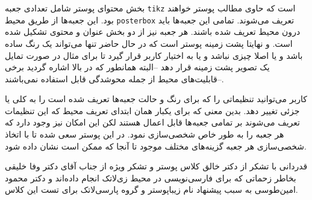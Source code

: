 \documentclass[debug,a0paper]{xebaposter}
\begin{document}
\begin{poster}
\begin{posterbox}[name=imagedataset,column=0,span=1,below=introduction,textborder=roundedleft]
بخش محتوای پوستر شامل تعدادی جعبه \texttt{tikz} است که حاوی مطالب پوستر خواهند بود. این جعبه‌ها از طریق 
محیط \texttt{posterbox} تعریف می‌شوند. تمامی این جعبه‌ها باید درون محیط  تعریف شده باشند. 
هر جعبه نیز از دو بخش عنوان و محتوی تشکیل شده است. و نهایتا پشت زمینه پوستر است که در حال حاضر تنها می‌تواند یک رنگ ساده 
باشد و یا اصلا چیزی نباشد و یا به اختیار کاربر قرار گیرد تا برای مثال در صورت تمایل یک تصویر پشت زمینه قرار دهد --البته همانطور که 
در بالا اشاره گردید برخی قابلیت‌های محیط  از جمله محوشدگی قابل استفاده نمی‌باشند--. 
\end{posterbox}
\begin{posterbox}[name=setting,column=0,span=1,below=imagedataset%
,headerFontColor=brown,textborder=roundedright,headershape=roundedright]
{}
کاربر می‌توانید تنظیماتی را که برای رنگ و حالت جعبه‌ها تعریف شده است را به کلی یا جزئی تغییر دهد. بدین معنی که برای یکبار همان
ابتدای تعریف محیط  که این تنظیمات تعریف می‌شوند بر تمامی جعبه‌ها قابل اعمال هستند لکن این امکان نیز وجود دارد 
که هر جعبه را به طور خاص شخصی‌سازی نمود. در این پوستر سعی شده تا با اتخاذ 
شخصی‌سازی هر جعبه گزینه‌های مختلف موجود تا آنجا که ممکن است نشان داده شود. 
\end{posterbox}
\begin{posterbox}[name=ack,column=0,span=1,below=setting,
,textborder=triangles]{قدردانی}
با تشکر از دکتر  خالق کلاس پوستر و تشکر ویژه از جناب آقای دکتر وفا خلیقی بخاطر زحماتی که برای فارسی‌نویسی در
محیط زی‌لاتک انجام‌ داده‌اند و دکتر محمود امین‌طوسی به سبب پیشنهاد نام زیباپوستر و گروه پارسی‌لاتک برای تست این کلاس.

\end{posterbox} 
\end{poster}
\end{document}
